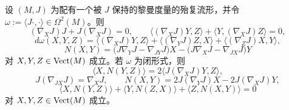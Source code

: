 \begin{lemma}\label{lem:C-7-1}
设 $(M,J)$ 为配有一个被 $J$ 保持的黎曼度量的殆复流形，并令 $\omega:=\langle J\cdot,\cdot\rangle\in\Omega^2(M)$。则
\begin{equation}\label{eq:C-7-1}
  (\nabla_XJ)J+J(\nabla_XJ)=0,\qquad
  \langle(\nabla_XJ)Y,Z\rangle+\langle Y,(\nabla_XJ)Z\rangle=0,
\end{equation}
\begin{equation}\label{eq:C-7-2}
  d\omega(X,Y,Z)=\langle(\nabla_XJ)Y,Z\rangle
  +\langle(\nabla_YJ)Z,X\rangle
  +\langle(\nabla_ZJ)X,Y\rangle,
\end{equation}
\begin{equation}\label{eq:C-7-3}
  N(X,Y)=\bigl(J\nabla_YJ-\nabla_{JY}J\bigr)X
    -\bigl(J\nabla_XJ-\nabla_{JX}J\bigr)Y
\end{equation}
对 $X,Y,Z\in\operatorname{Vect}(M)$ 成立。若 $\omega$ 为闭形式，则
\begin{equation}\label{eq:C-7-4}
  \langle X,N(Y,Z)\rangle=2\langle J(\nabla_XJ)Y,Z\rangle,
\end{equation}
\begin{equation}\label{eq:C-7-5}
  J(\nabla_{JX}J)=\nabla_XJ,\qquad
  N(X,Y)=2J(\nabla_YJ)X-2J(\nabla_XJ)Y,
\end{equation}
\begin{equation}\label{eq:C-7-6}
  \langle X,N(Y,Z)\rangle+\langle Y,N(Z,X)\rangle
    +\langle Z,N(X,Y)\rangle=0
\end{equation}
对 $X,Y,Z\in\operatorname{Vect}(M)$ 成立。
\end{lemma}
